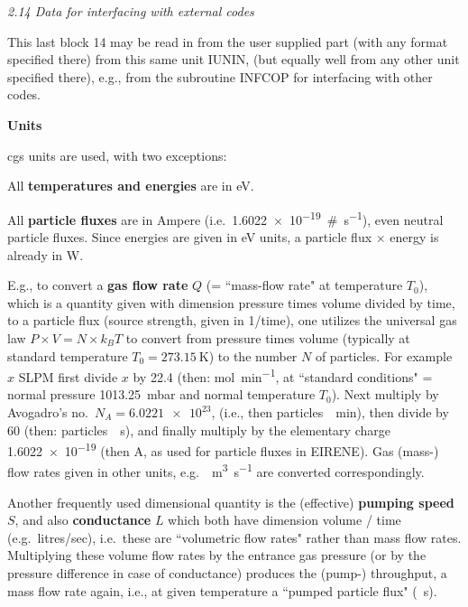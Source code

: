 \textsl{2.14 Data for interfacing with external codes}

\medskip

This last block 14 may be read in from the user supplied part (with any format
specified there) from this same unit IUNIN, (but equally well from any other
unit specified there), e.g., from the subroutine INFCOP for interfacing with
other codes.

\medskip

\medskip

\textbf{Units} 

cgs units are used, with two exceptions:

\medskip

All \textbf{temperatures and energies} are in \si{\electronvolt}.

All \textbf{particle fluxes} are in Ampere (i.e.\
\SI{1.6022e-19}{\#\per\second}), even neutral particle fluxes.
Since energies are given in \si{\electronvolt} units, a particle flux $\times$
energy is already in \si{\watt}.

E.g., to convert a \textbf{gas flow rate} $Q$ (= ``mass-flow rate" at
temperature $T_0$), which is a quantity given with dimension pressure times
volume divided by time, to a particle flux (source strength, given in
1/\;time), one utilizes the universal gas law $P \times V = N \times k_B T$ to
convert from pressure times volume (typically at standard temperature $T_0=
  \SI{273.15}{\kelvin}$) to the number $N$ of particles.
For example  $x$ \ac{SLPM} first divide $x$ by \num{22.4} (then:
\si{\mole\per\minute}, at ``standard conditions" = normal pressure
\SI{1013.25}{\milli\bar} and normal temperature $T_0$).
Next multiply by Avogadro's no.\ $N_A = \num{6.0221e23}$, (i.e., then
particles~\si{\per\minute}), then divide by \num{60} (then:
particles~\si{\per\second}), and finally multiply by the elementary charge
\num{1.6022e-19}
(then \si{\ampere}, as used for particle fluxes in EIRENE).
Gas (mass-) flow rates given in other units, e.g.\
\si{\torr\cubic\metre\per\second} are converted correspondingly.

Another frequently used dimensional quantity is the (effective) 
\textbf{pumping speed} $S$, and also \textbf{conductance} $L$ which both have 
dimension volume / time (e.g.\ litres/sec), i.e.\ these are 
``volumetric flow rates" rather than mass flow rates.
Multiplying these volume flow rates by the entrance gas pressure (or by the
pressure difference in case of conductance) produces the (pump-) throughput, a
mass flow rate again, i.e., at given temperature a ``pumped particle flux"
(\si{\per\second}).


